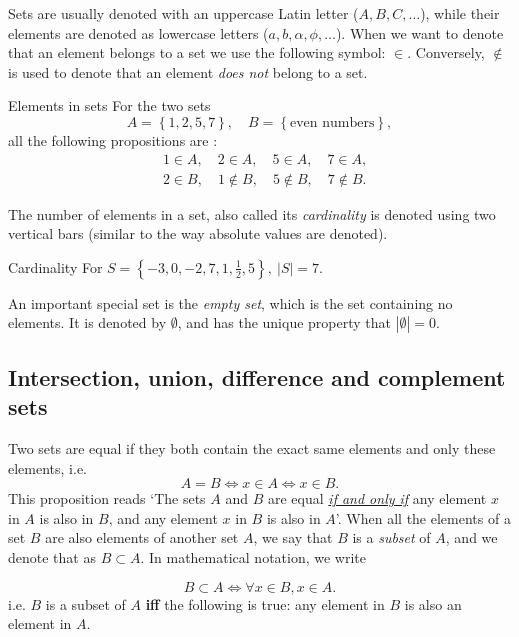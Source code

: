 Sets are usually denoted with an uppercase Latin letter ($A,B,C,\dots$), while their elements are denoted as lowercase letters ($a,b,\alpha,\phi,\dots$). When we want to denote that an element belongs to a set we use the following symbol: $\in$. Conversely, $\notin$ is used to denote that an element \textit{does not} belong to a set.
	
\begin{example}{Elements in sets}{}
	For the two sets
	\[
		A = \left\{ 1,2,5,7 \right\},\quad B=\left\{ \text{even numbers} \right\},
	\]
	all the following propositions are \true{}:
	\begin{align*}
		&1\in A,\quad 2\in A,\quad 5\in A,\quad 7\in A,\\
		&2\in B,\quad 1\notin B,\quad 5\notin B,\quad 7\notin B.
	\end{align*}
\end{example}

The number of elements in a set, also called its \emph{cardinality} is denoted using two vertical bars (similar to the way absolute values are denoted).

\begin{example}{Cardinality}{}
	For $S=\left\{ -3,0,-2,7,1,\frac{1}{2},5 \right\},\ |S|=7$.
\end{example}

An important special set is the \emph{empty set}, which is the set containing no elements. It is denoted by $\emptyset$, and has the unique property that $|\emptyset|=0$.

\subsection{Intersection, union, difference and complement sets}

Two sets are equal if they both contain the exact same elements and only these elements, i.e.
\begin{equation}
	A = B \Longleftrightarrow x\in A \Leftrightarrow x\in B.
	\label{eq:set_equality}
\end{equation}
This proposition reads `The sets $A$ and $B$ are equal \underline{\textit{if and only if}} any element $x$ in $A$ is also in $B$, and any element $x$ in $B$ is also in $A$'. When all the elements of a set $B$ are also elements of another set $A$, we say that $B$ is a \emph{subset} of $A$, and we denote that as $B\subset A$. In mathematical notation, we write

\begin{equation}
	B\subset A \Leftrightarrow \forall x\in B, x\in A.
	\label{eq:subset_def}
\end{equation}
i.e. $B$ is a subset of $A$ \textbf{iff} the following is true: any element in $B$ is also an element in $A$.

